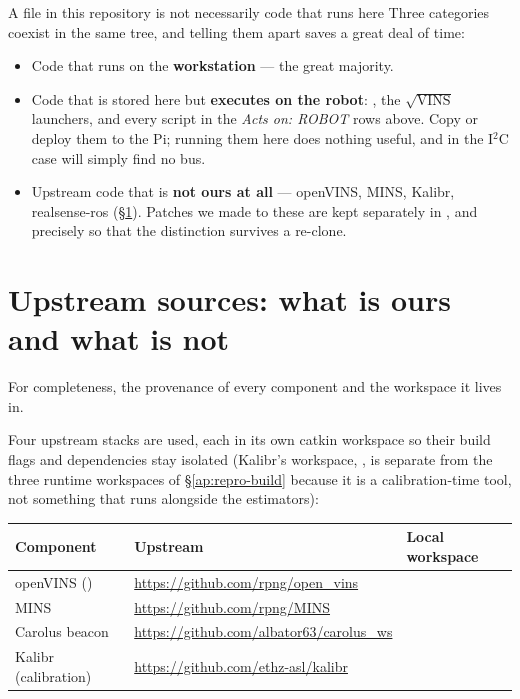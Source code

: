 \begin{trapbox}{A file in this repository is not necessarily code that runs
here}
Three categories coexist in the same tree, and telling them apart saves a
great deal of time:
\begin{itemize}[leftmargin=1.4em]
\item Code that runs on the \textbf{workstation} --- the great majority.
\item Code that is stored here but \textbf{executes on the robot}:
  , the $\sqrt{\text{VINS}}$ launchers, and every
  script in the \emph{Acts on: ROBOT} rows above. Copy or deploy them to the
  Pi; running them here does nothing useful, and in the I$^2$C case will
  simply find no bus.
\item Upstream code that is \textbf{not ours at all} --- openVINS, MINS,
  Kalibr, realsense-ros (\S\ref{ap:repro-repos}). Patches we made to these
  are kept separately in ,  and
   precisely so that the distinction survives a
  re-clone.
\end{itemize}
\end{trapbox}

\section{Upstream sources: what is ours and what is not}
\label{ap:repro-repos}
For completeness, the provenance of every component and the
workspace it lives in.

Four upstream stacks are used, each in its own catkin workspace so their
build flags and dependencies stay isolated (Kalibr's workspace,
, is separate from the three runtime workspaces of
\S\ref{ap:repro-build} because it is a calibration-time tool, not something
that runs alongside the estimators):

\begingroup\small
\begin{longtable}{@{}L{3.2cm}L{5.6cm}L{4.6cm}@{}}
\toprule
Component & Upstream & Local workspace \\
\midrule
\endhead
openVINS () & \url{https://github.com/rpng/open_vins} &
   \\
MINS & \url{https://github.com/rpng/MINS} &
   \\
Carolus beacon & \url{https://github.com/albator63/carolus_ws} &
   \\
Kalibr (calibration) & \url{https://github.com/ethz-asl/kalibr} &
   \\
\bottomrule
\end{longtable}
\endgroup


